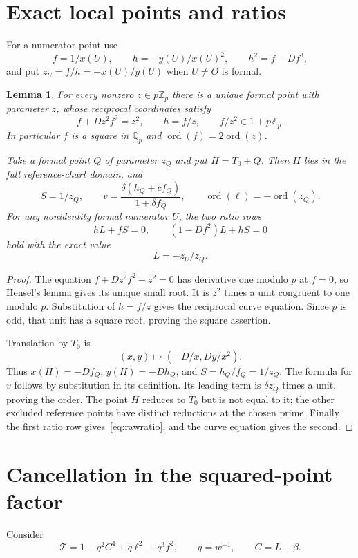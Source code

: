 \documentclass[11pt,a4paper]{article}
\newtheorem{lemma}[theorem]{Lemma}
\theoremstyle{remark}\newtheorem{remark}[theorem]{Remark}
\newcommand{\Q}{\mathbb Q}\newcommand{\Z}{\mathbb Z}
\begin{document}
\section{Exact local points and ratios}
For a numerator point use
\[
 f=1/x(U),\qquad h=-y(U)/x(U)^2,
 \qquad h^2=f-Df^3,
\]
and put $z_U=f/h=-x(U)/y(U)$ when $U\ne O$ is formal.

\begin{lemma}\label{lem:local}
For every nonzero $z\in p\Z_p$ there is a unique formal point
with parameter $z$, whose reciprocal coordinates satisfy
\[
 f+D z^2f^2=z^2,\qquad h=f/z,\qquad f/z^2\in1+p\Z_p.
\]
In particular $f$ is a square in $\Q_p$ and
$\operatorname{ord}(f)=2\operatorname{ord}(z)$.

Take a formal point $Q$ of parameter $z_Q$ and put $H=T_0+Q$.
Then $H$ lies in the full reference-chart domain, and
\begin{equation}\label{eq:localref}
 S=1/z_Q,\qquad
 v=\frac{\delta(h_Q+c f_Q)}{1+\delta f_Q},\qquad
 \operatorname{ord}(\ell)=-\operatorname{ord}(z_Q).
\end{equation}
For any nonidentity formal numerator $U$, the two ratio rows
\[
 hL+fS=0,\qquad(1-Df^2)L+hS=0
\]
hold with the exact value
\begin{equation}\label{eq:rawratio}
                              L=-z_U/z_Q.
\end{equation}
\end{lemma}

\begin{proof}
The equation $f+D z^2f^2-z^2=0$ has derivative one modulo $p$ at
$f=0$, so Hensel's lemma gives its unique small root. It is
$z^2$ times a unit congruent to one modulo $p$. Substitution of
$h=f/z$ gives the reciprocal curve equation. Since $p$ is odd,
that unit has a square root, proving the square assertion.

Translation by $T_0$ is
\[
 (x,y)\longmapsto(-D/x,Dy/x^2).
\]
Thus $x(H)=-Df_Q$, $y(H)=-Dh_Q$, and $S=h_Q/f_Q=1/z_Q$.
The formula for $v$ follows by substitution in its definition.
Its leading term is $\delta z_Q$ times a unit, proving the order.
The point $H$ reduces to $T_0$ but is not equal to it; the other
excluded reference points have distinct reductions at the chosen
prime. Finally the first ratio row gives~\eqref{eq:rawratio},
and the curve equation gives the second.
\end{proof}

\section{Cancellation in the squared-point factor}
Consider
\begin{equation}\label{eq:squared}
           \mathcal T=1+q^2C^4+q\ell^2+q^3f^2,
           \qquad q=w^{-1},\qquad C=L-\beta.
\end{equation}
\end{document}
